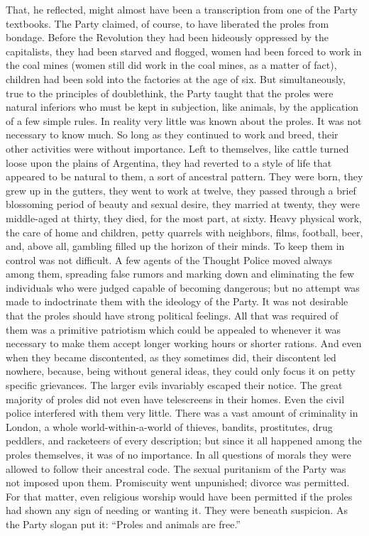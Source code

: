 That, he reflected, might almost have been a transcription from one of
the Party textbooks. The Party claimed, of course, to have liberated the
proles from bondage. Before the Revolution they had been hideously
oppressed by the capitalists, they had been starved and flogged, women
had been forced to work in the coal mines (women still did work in the
coal mines, as a matter of fact), children had been sold into the
factories at the age of six. But simultaneously, true to the principles
of doublethink, the Party taught that the proles were natural inferiors
who must be kept in subjection, like animals, by the application of a
few simple rules. In reality very little was known about the proles. It
was not necessary to know much. So long as they continued to work and
breed, their other activities were without importance. Left to
themselves, like cattle turned loose upon the plains of Argentina, they
had reverted to a style of life that appeared to be natural to them, a
sort of ancestral pattern. They were born, they grew up in the gutters,
they went to work at twelve, they passed through a brief blossoming
period of beauty and sexual desire, they married at twenty, they were
middle-aged at thirty, they died, for the most part, at sixty. Heavy
physical work, the care of home and children, petty quarrels with
neighbors, films, football, beer, and, above all, gambling filled up the
horizon of their minds. To keep them in control was not difficult. A few
agents of the Thought Police moved always among them, spreading false
rumors and marking down and eliminating the few individuals who were
judged capable of becoming dangerous; but no attempt was made to
indoctrinate them with the ideology of the Party. It was not desirable
that the proles should have strong political feelings. All that was
required of them was a primitive patriotism which could be appealed to
whenever it was necessary to make them accept longer working hours or
shorter rations. And even when they became discontented, as they
sometimes did, their discontent led nowhere, because, being without
general ideas, they could only focus it on petty specific grievances.
The larger evils invariably escaped their notice. The great majority of
proles did not even have telescreens in their homes. Even the civil
police interfered with them very little. There was a vast amount of
criminality in London, a whole world-within-a-world of thieves, bandits,
prostitutes, drug peddlers, and racketeers of every description; but
since it all happened among the proles themselves, it was of no
importance. In all questions of morals they were allowed to follow their
ancestral code. The sexual puritanism of the Party was not imposed upon
them. Promiscuity went unpunished; divorce was permitted. For that
matter, even religious worship would have been permitted if the proles
had shown any sign of needing or wanting it. They were beneath
suspicion. As the Party slogan put it: ``Proles and animals are free.''

